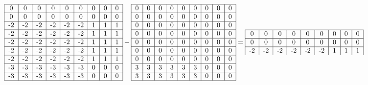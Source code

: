 \documentclass{article}
\begin{document}
\begin{equation}
    \begin{tabular}{ | c | c | c | c | c | c | c | c | c | }
        \hline
        0 & 0 & 0 & 0 & 0 & 0 & 0 & 0 & 0 \\ 
        \hline
        0 & 0 & 0 & 0 & 0 & 0 & 0 & 0 & 0 \\ 
        \hline
        -2 & -2 & -2 & -2 & -2 & -2 & 1 & 1 & 1 \\ 
        \hline
        -2 & -2 & -2 & -2 & -2 & -2 & 1 & 1 & 1 \\ 
        \hline
        -2 & -2 & -2 & -2 & -2 & -2 & 1 & 1 & 1 \\ 
        \hline
        -2 & -2 & -2 & -2 & -2 & -2 & 1 & 1 & 1 \\ 
        \hline
        -2 & -2 & -2 & -2 & -2 & -2 & 1 & 1 & 1 \\ 
        \hline
        -3 & -3 & -3 & -3 & -3 & -3 & 0 & 0 & 0 \\ 
        \hline
        -3 & -3 & -3 & -3 & -3 & -3 & 0 & 0 & 0 \\ 
        \hline
    \end{tabular} + \begin{tabular}{ | c | c | c | c | c | c | c | c | c | }
        \hline
        0 & 0 & 0 & 0 & 0 & 0 & 0 & 0 & 0 \\ 
        \hline
        0 & 0 & 0 & 0 & 0 & 0 & 0 & 0 & 0 \\ 
        \hline
        0 & 0 & 0 & 0 & 0 & 0 & 0 & 0 & 0 \\ 
        \hline
        0 & 0 & 0 & 0 & 0 & 0 & 0 & 0 & 0 \\ 
        \hline
        0 & 0 & 0 & 0 & 0 & 0 & 0 & 0 & 0 \\ 
        \hline
        0 & 0 & 0 & 0 & 0 & 0 & 0 & 0 & 0 \\ 
        \hline
        0 & 0 & 0 & 0 & 0 & 0 & 0 & 0 & 0 \\ 
        \hline
        3 & 3 & 3 & 3 & 3 & 3 & 0 & 0 & 0 \\ 
        \hline
        3 & 3 & 3 & 3 & 3 & 3 & 0 & 0 & 0 \\ 
        \hline
    \end{tabular} = 
    \begin{tabular}{ | c | c | c | c | c | c | c | c | c | }
        \hline
        0 & 0 & 0 & 0 & 0 & 0 & 0 & 0 & 0 \\ 
        \hline
        0 & 0 & 0 & 0 & 0 & 0 & 0 & 0 & 0 \\ 
        \hline
        -2 & -2 & -2 & -2 & -2 & -2 & 1 & 1 & 1 \\ 

\end{tabular}
\end{equation}
\end{document}

